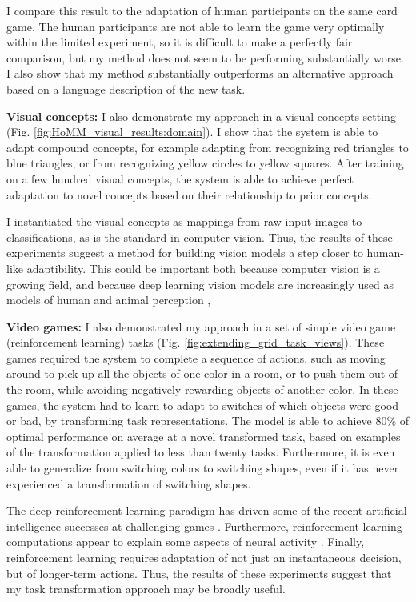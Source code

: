 \documentclass[12pt]{article}
\begin{document}
I compare this result to the adaptation of human participants on the same card game. The human participants are not able to learn the game very optimally within the limited experiment, so it is difficult to make a perfectly fair comparison, but my method does not seem to be performing substantially worse. I also show that my method substantially outperforms an alternative approach based on a language description of the new task.

\textbf{Visual concepts:} I also demonstrate my approach in a visual concepts setting (Fig. \ref{fig:HoMM_visual_results:domain}). I show that the system is able to adapt compound concepts, for example adapting from recognizing red triangles to blue triangles, or from recognizing yellow circles to yellow squares. After training on a few hundred visual concepts, the system is able to achieve perfect adaptation to novel concepts based on their relationship to prior concepts.

I instantiated the visual concepts as mappings from raw input images to classifications, as is the standard in computer vision. Thus, the results of these experiments suggest a method for building vision models a step closer to human-like adaptibility. This could be important both because computer vision is a growing field, and because deep learning vision models are increasingly used as models of human and animal perception \citep{Yamins2014,Kriegeskorte2015},   

\textbf{Video games:} I also demonstrated my approach in a set of simple video game (reinforcement learning) tasks (Fig. \ref{fig:extending_grid_task_views}). These games required the system to complete a sequence of actions, such as moving around to pick up all the objects of one color in a room, or to push them out of the room, while avoiding negatively rewarding objects of another color. In these games, the system had to learn to adapt to switches of which objects were good or bad, by transforming task representations. The model is able to achieve 80\% of optimal performance on average at a novel transformed task, based on examples of the transformation applied to less than twenty tasks. Furthermore, it is even able to generalize from switching colors to switching shapes, even if it has never experienced a transformation of switching shapes. 

The deep reinforcement learning paradigm has driven some of the recent artificial intelligence successes at challenging games \citep{Silver2017,Vinyals2019}. Furthermore, reinforcement learning computations appear to explain some aspects of neural activity \citep{Dabney2020}. Finally, reinforcement learning requires adaptation of not just an instantaneous decision, but of longer-term actions. Thus, the results of these experiments suggest that my task transformation approach may be broadly useful.
\end{document}

